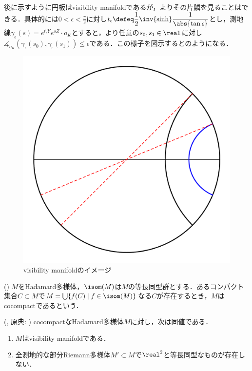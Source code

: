 後に示すように{\Poincare}円板はvisibility manifoldであるが，よりその片鱗を見ることはできる．具体的には$ 0 <  \epsilon  < \frac{\pi}{2} $に対し$t_{\epsilon} \defeq \dfrac{1}{2}\inv{\sinh}\dfrac{1}{\abs{\tan \epsilon}} $とし，測地線$\gamma_{\epsilon}(s) = e^{t_{\epsilon} Y}e^{sZ}\cdot o_K $とすると，より任意の$s_0,s_1\in \real$に対し$\measuredangle_{o_K}(\gamma_{\epsilon} (s_0), \gamma_{\epsilon} (s_1)) \leq \epsilon $である．この様子を図示するとのようになる．

\begin{figure}[H]
  \centering
  \includegraphics[scale=0.3]{../graph/visibility-2.pdf}
  \caption{visibility manifoldのイメージ}
  \label{fig:visibility}
\end{figure}

\begin{defi}({\cite[p.~202]{bh99}})
  $M$をHadamard多様体，$\isom(M)$は$M$の等長同型群とする．あるコンパクト集合$C\subset M$で$ M = \bigcup\{f(C)\mid f\in \isom(M) \}  $なる$C$が存在するとき，$M$はcocompactであるという．
\end{defi}

\begin{thm}{({\cite[p.~296, 9.33~Theorem]{bh99}, 原典: \cite[Theorem~4.1]{e72-2}})}\label{thm:visibility-and-rank}  
  cocompactなHadamard多様体$M$に対し，次は同値である．
  \begin{enumerate}
    \renewcommand{\labelenumi}{(\roman{enumi})}
  \item $M$はvisibility manifoldである．
  \item 全測地的な部分Riemann多様体$M'\subset M$で$\real^2$と等長同型なものが存在しない．
  \end{enumerate}
\end{thm}

